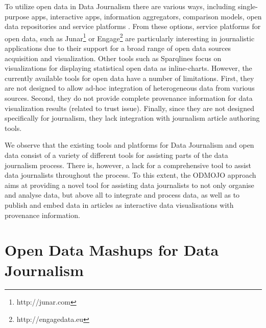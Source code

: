 \documentclass[runningheads,a4paper]{llncs}
\begin{document}
To utilize open data in Data Journalism there are various ways, including single-purpose apps, interactive apps, information aggregators, comparison models, open data repositories and service platforms  \cite{_Ref490833966}. From these options, service platforms for open data, such as Junar\footnote{ http://junar.com} or Engage\footnote{ http://engagedata.eu} are particularly interesting in journalistic applications due to their support for a broad range of open data sources acquisition and visualization. Other tools such as Sparqlines  \cite{_Ref490834073} focus on visualizations for displaying statistical open data as inline-charts. However, the currently available tools for open data have a number of limitations. First, they are not designed to allow ad-hoc integration of heterogeneous data from various sources. Second, they do not provide complete provenance information for data visualization results (related to trust issue). Finally, since they are not designed specifically for journalism, they lack integration with journalism article authoring tools.

We observe that the existing tools and platforms for Data Journalism and open data consist of a variety of different tools for assisting parts of the data journalism process. There is, however, a lack for a comprehensive tool to assist data journalists throughout the process. To this extent, the ODMOJO approach aims at providing a novel tool for assisting data journalists to not only organise and analyse data, but above all to integrate and process data, as well as to publish and embed data in articles as interactive data visualisations with provenance information. 

\section{Open Data Mashups for Data Journalism}
\end{document}
